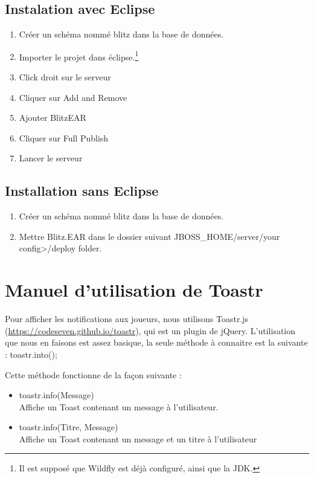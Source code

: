 \documentclass[11pt]{scrreprt}
\begin{document}
    \subsection{Instalation avec Eclipse}
    \begin{enumerate}
        \item Créer un schéma nommé \og blitz\fg{} dans la base de données.
        \item Importer le projet dans éclipse.\footnote{Il est supposé que Wildfly est déjà configuré, ainsi que la JDK.}
        \item Click droit sur le serveur
        \item Cliquer sur \og Add and Remove\fg{}
        \item Ajouter \og BlitzEAR\fg{}
        \item Cliquer sur \og Full Publish\fg{}
        \item Lancer le serveur
    \end{enumerate}
    \subsection{Installation sans Eclipse}
    \begin{enumerate}
        \item Créer un schéma nommé \og blitz\fg{} dans la base de données.
        \item Mettre Blitz.EAR dans le dossier suivant JBOSS\_HOME/server/your config>/deploy folder.
    \end{enumerate}

    \section{Manuel d'utilisation de Toastr}
    Pour afficher les notifications aux joueurs, nous utilisons Toastr.js (\url{https://codeseven.github.io/toastr}), qui est un plugin de jQuery. L'utilisation que nous en faisons est assez basique, la seule méthode à connaitre est la suivante : toastr.into();

    Cette méthode fonctionne de la façon suivante :

    \begin{itemize}
        \item toastr.info(\og Message\fg)\\ Affiche un Toast contenant un message à l'utilisateur.
        \item toastr.info(\og Titre\fg, \og Message\fg)\\ Affiche un Toast contenant un message et un titre à l'utilisateur
    \end{itemize}
\end{document}
